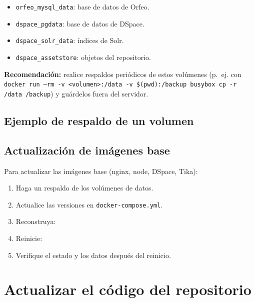 \documentclass[12pt,a4paper]{report}
\begin{document}
\begin{itemize}
  \item \texttt{orfeo\_mysql\_data}: base de datos de Orfeo.
  \item \texttt{dspace\_pgdata}: base de datos de DSpace.
  \item \texttt{dspace\_solr\_data}: índices de Solr.
  \item \texttt{dspace\_assetstore}: objetos del repositorio.
\end{itemize}

\begin{mdframed}[style=importantstyle]
  \textbf{Recomendación:} realice respaldos periódicos de estos volúmenes
  (p.~ej. con \texttt{docker run --rm -v <volumen>:/data -v \$(pwd):/backup
  busybox cp -r /data /backup}) y guárdelos fuera del servidor.
\end{mdframed}

\subsection{Ejemplo de respaldo de un volumen}


\subsection{Actualización de imágenes base}

Para actualizar las imágenes base (nginx, node, DSpace, Tika):

\begin{enumerate}
  \item Haga un respaldo de los volúmenes de datos.
  \item Actualice las versiones en \texttt{docker-compose.yml}.
  \item Reconstruya: 
  \item Reinicie: 
  \item Verifique el estado y los datos después del reinicio.
\end{enumerate}

\section{Actualizar el código del repositorio}
\end{document}
